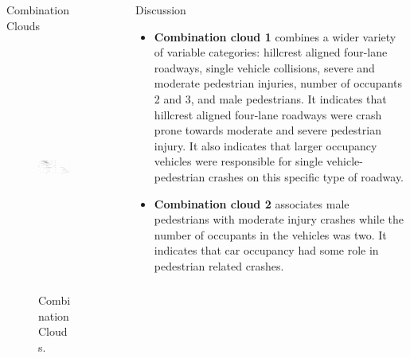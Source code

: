 \documentclass[final]{beamer}
\newlength{\sepwid}
\newlength{\onecolwid}
\newlength{\twocolwid}
\begin{document}
\begin{frame}[t]
\begin{columns}[t]
\begin{column}{\twocolwid}
\begin{columns}[t,totalwidth=\twocolwid]
\begin{column}{\onecolwid}
\begin{block}{Combination Clouds}
\begin{figure}
\begin{center}
              \end{center}
            \end{figure}
          \begin{figure}
              \begin{center}
                \includegraphics[width=10in, height=3.2in]{m4.jpg}
                \caption{Combination Clouds.}
                \label{fig:multDom}
              \end{center}
            \end{figure}
        \end{block}
      \end{column}
    \end{columns}
  \end{column}
  \begin{column}{\sepwid}\end{column}			%
  \begin{column}{\onecolwid}
    \begin{block}{Discussion}
             \small{}
              \begin{itemize}
              \item \textbf{Combination cloud 1} combines a wider variety of variable categories: hillcrest aligned four-lane roadways, single vehicle collisions, severe and moderate pedestrian injuries, number of occupants 2 and 3, and male pedestrians.  It indicates that hillcrest aligned four-lane roadways were crash prone towards moderate and severe pedestrian injury. It also indicates that larger occupancy vehicles were responsible for single vehicle-pedestrian crashes on this specific type of roadway.
              \item \textbf{Combination cloud 2} associates male pedestrians with moderate injury crashes while the number of occupants in the vehicles was two.  It indicates that car occupancy had some role in pedestrian related crashes.

\end{itemize}
\end{block}
\end{column}
\end{columns}
\end{frame}
\end{document}
